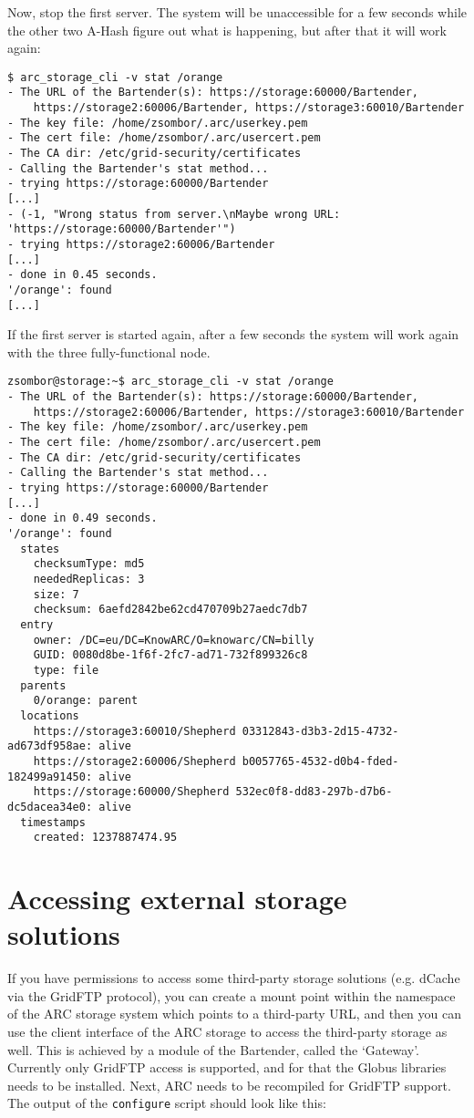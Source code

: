 \documentclass{article}
\begin{document}
Now, stop the first server. The system will be unaccessible for a few seconds while the other two A-Hash figure out what is happening, but after that it will work again:

\begin{verbatim}
$ arc_storage_cli -v stat /orange
- The URL of the Bartender(s): https://storage:60000/Bartender,
    https://storage2:60006/Bartender, https://storage3:60010/Bartender
- The key file: /home/zsombor/.arc/userkey.pem
- The cert file: /home/zsombor/.arc/usercert.pem
- The CA dir: /etc/grid-security/certificates
- Calling the Bartender's stat method...
- trying https://storage:60000/Bartender
[...]
- (-1, "Wrong status from server.\nMaybe wrong URL: 'https://storage:60000/Bartender'")
- trying https://storage2:60006/Bartender
[...]
- done in 0.45 seconds.
'/orange': found
[...]
\end{verbatim}

If the first server is started again, after a few seconds the system will work again with the three fully-functional node.

\begin{verbatim}
zsombor@storage:~$ arc_storage_cli -v stat /orange
- The URL of the Bartender(s): https://storage:60000/Bartender,
    https://storage2:60006/Bartender, https://storage3:60010/Bartender
- The key file: /home/zsombor/.arc/userkey.pem
- The cert file: /home/zsombor/.arc/usercert.pem
- The CA dir: /etc/grid-security/certificates
- Calling the Bartender's stat method...
- trying https://storage:60000/Bartender
[...]
- done in 0.49 seconds.
'/orange': found
  states
    checksumType: md5
    neededReplicas: 3
    size: 7
    checksum: 6aefd2842be62cd470709b27aedc7db7
  entry
    owner: /DC=eu/DC=KnowARC/O=knowarc/CN=billy
    GUID: 0080d8be-1f6f-2fc7-ad71-732f899326c8
    type: file
  parents
    0/orange: parent
  locations
    https://storage3:60010/Shepherd 03312843-d3b3-2d15-4732-ad673df958ae: alive
    https://storage2:60006/Shepherd b0057765-4532-d0b4-fded-182499a91450: alive
    https://storage:60000/Shepherd 532ec0f8-dd83-297b-d7b6-dc5dacea34e0: alive
  timestamps
    created: 1237887474.95    
\end{verbatim}

\section{Accessing external storage solutions} %
\label{sec:using_the_gateway}

If you have permissions to access some third-party storage solutions (e.g. dCache via the GridFTP protocol), you can create a mount point within the namespace of the ARC storage system which points to a third-party URL, and then you can use the client interface of the ARC storage to access the third-party storage as well. This is achieved by a module of the Bartender, called the `Gateway'. Currently only GridFTP access is supported, and for that the Globus libraries needs to be installed. Next, ARC needs to be recompiled for GridFTP support. The output of the \verb!configure! script should look like this:
\end{document}
